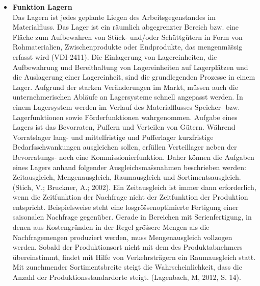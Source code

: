 \begin{itemize}
\item \textbf{Funktion Lagern} \\
Das Lagern ist jedes geplante Liegen des Arbeitsgegenstandes im Materialfluss. Das Lager ist ein r\"aumlich abgegrenzter Bereich bzw. eine Fl\"ache zum Aufbewahren von St\"uck- und/oder Sch\"uttg\"utern in Form von Rohmaterialien, Zwischenprodukte oder Endprodukte, das mengenm\"a\"ssig erfasst wird (VDI-2411). Die Einlagerung von Lagereinheiten, die Aufbewahrung und Bereithaltung von Lagereinheiten auf Lagerpl\"atzen und die Auslagerung einer Lagereinheit, sind die grundlegenden Prozesse in einem Lager.
Aufgrund der starken Ver\"anderungen im Markt, m\"ussen auch die unternehmerischen Abl\"aufe an Lagersysteme schnell angepasst werden. In einem Lagersystem werden im Verlauf des Materialflusses Speicher- bzw. Lagerfunktionen sowie F\"orderfunktionen wahrgenommen. 
Aufgabe eines Lagers ist das Bevorraten, Puffern und Verteilen von G\"utern. W\"ahrend Vorratslager lang- und mittelfristige und Pufferlager kurzfristige Bedarfsschwankungen ausgleichen sollen, erf\"ullen Verteillager neben der Bevorratungs- noch eine Kommissionierfunktion. Daher k\"onnen die Aufgaben eines Lagers anhand folgender Ausgleichsma\"ssnahmen beschrieben werden: Zeitausgleich, Mengenausgleich, Raumausgleich und Sortimentsausgleich. (Stich, V.; Bruckner, A.; 2002). Ein Zeitausgleich ist immer dann erforderlich, wenn die Zeitfunktion der Nachfrage nicht der Zeitfunktion der Produktion entspricht. Beispielsweise steht eine losgr\"o\"ssenoptimierte Fertigung einer saisonalen Nachfrage gegen\"uber. Gerade in Bereichen mit Serienfertigung, in denen aus Kostengr\"unden in der Regel gr\"o\"ssere Mengen als die Nachfragemengen produziert werden, muss Mengenausgleich vollzogen werden. Sobald der Produktionsort nicht mit dem des Produktabnehmers \"ubereinstimmt, findet mit Hilfe von Verkehrstr\"agern ein Raumausgleich statt. Mit zunehmender Sortimentsbreite steigt die Wahrscheinlichkeit, dass die Anzahl der Produktionsstandardorte steigt. (Lagenbach, M, 2012, S. 14).


\end{itemize}
